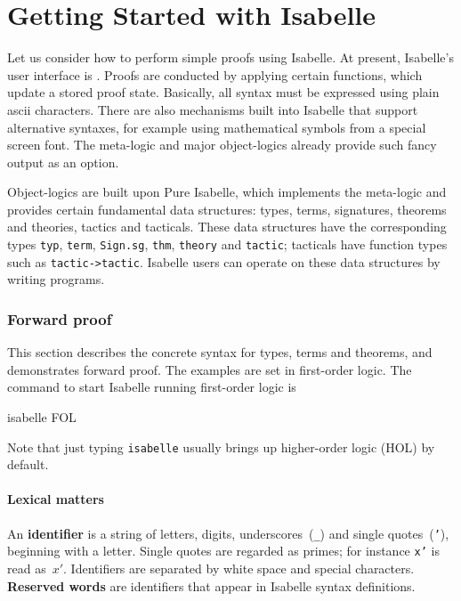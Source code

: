 \part{Getting Started with Isabelle}\label{chap:getting}
Let us consider how to perform simple proofs using Isabelle.  At
present, Isabelle's user interface is \ML.  Proofs are conducted by
applying certain \ML{} functions, which update a stored proof state.
Basically, all syntax must be expressed using plain {\sc ascii}
characters.  There are also mechanisms built into Isabelle that support
alternative syntaxes, for example using mathematical symbols from a
special screen font.  The meta-logic and major object-logics already
provide such fancy output as an option.

Object-logics are built upon Pure Isabelle, which implements the
meta-logic and provides certain fundamental data structures: types,
terms, signatures, theorems and theories, tactics and tacticals.
These data structures have the corresponding \ML{} types \texttt{typ},
\texttt{term}, \texttt{Sign.sg}, \texttt{thm}, \texttt{theory} and \texttt{tactic};
tacticals have function types such as \texttt{tactic->tactic}.  Isabelle
users can operate on these data structures by writing \ML{} programs.


\section{Forward proof}\label{sec:forward} 
This section describes the concrete syntax for types, terms and theorems,
and demonstrates forward proof.  The examples are set in first-order logic.
The command to start Isabelle running first-order logic is
\begin{ttbox}
isabelle FOL
\end{ttbox}
Note that just typing \texttt{isabelle} usually brings up higher-order logic
(HOL) by default.


\subsection{Lexical matters}
An {\bf identifier} is a string of letters, digits, underscores~(\verb|_|)
and single quotes~({\tt'}), beginning with a letter.  Single quotes are
regarded as primes; for instance \texttt{x'} is read as~$x'$.  Identifiers are
separated by white space and special characters.  {\bf Reserved words} are
identifiers that appear in Isabelle syntax definitions.

